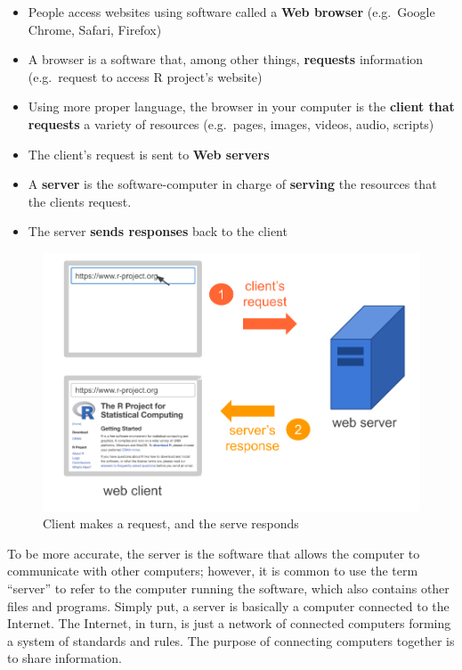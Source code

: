 \documentclass[
]{book}
\begin{document}
\begin{itemize}
\item
  People access websites using software called a \textbf{Web browser} (e.g.~Google
  Chrome, Safari, Firefox)
\item
  A browser is a software that, among other things, \textbf{requests} information
  (e.g.~request to access R project's website)
\item
  Using more proper language, the browser in your computer is the
  \textbf{client that requests} a variety of resources (e.g.~pages, images, videos,
  audio, scripts)
\item
  The client's request is sent to \textbf{Web servers}
\item
  A \textbf{server} is the software-computer in charge of \textbf{serving} the resources
  that the clients request.
\item
  The server \textbf{sends responses} back to the client
\end{itemize}

\begin{figure}

{\centering \includegraphics[width=0.7\linewidth]{images/http/web-scheme2} 

}

\caption{Client makes a request, and the serve responds}\label{fig:unnamed-chunk-5}
\end{figure}

To be more accurate, the server is the software that allows the computer
to communicate with other computers; however, it is common to use the term
``server'' to refer to the computer running the software, which also contains
other files and programs.
Simply put, a server is basically a computer connected to the Internet. The
Internet, in turn, is just a network of connected computers forming a system of
standards and rules. The purpose of connecting computers together is to share
information.
\end{document}
